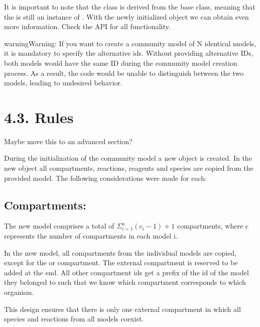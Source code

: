 \documentclass[letterpaper,10pt,english]{sphinxmanual}
\begin{document}
\sphinxAtStartPar
It is important to note that the  class is derived from the base  class, meaning that the
 is still an instance of . With the newly initialized object we can obtain even more information.
Check the API for all functionality.

\begin{sphinxadmonition}{warning}{Warning:}
\sphinxAtStartPar
If you want to create a community model of N identical models, it is mandatory to specify the alternative ids.
Without providing alternative IDs, both models would have the same ID during the community model creation process.
As a result, the code would be unable to distinguish between the two models, leading to undesired behavior.
\end{sphinxadmonition}


\section{4.3. Rules}
\label{\detokenize{4_community_matrix/home:rules}}
\sphinxAtStartPar
Maybe move this to an advanced section?

\sphinxAtStartPar
During the initialization of the community model a new  object is created. In the new object all compartments,
reactions, reagents and species are copied from the provided model. The following considerations were made for each:


\subsection{Compartments:}
\label{\detokenize{4_community_matrix/home:compartments}}
\sphinxAtStartPar
The new model comprises a total of \(\Sigma_{i=1}^{n} (c_i-1) + 1\) compartments, where c represents the number
of compartments in each model i.

\sphinxAtStartPar
In the new model, all compartments from the individual models are copied, except for the  or  compartment.
The external compartment is reserved to be added at the end. All other compartment ids get a prefix of the id of the model
they belonged to such that we know which compartment corresponds to which organism.

\sphinxAtStartPar
This design ensures that there is only one external compartment in which all species and reactions from all models coexist.
\end{document}
